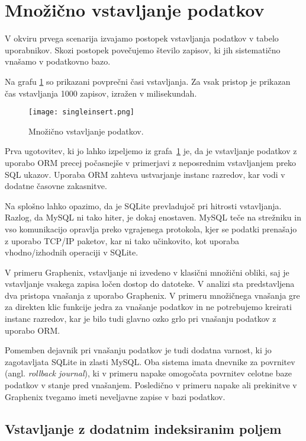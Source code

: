 \documentclass[a4paper,12pt,openright]{book}
\begin{document}
    \newpage
   \section{Množično vstavljanje podatkov}

    V okviru prvega scenarija izvajamo postopek vstavljanja podatkov v tabelo uporabnikov. Skozi postopek povečujemo število zapisov, ki jih sistematično vnašamo v podatkovno bazo.

    Na grafu \ref{vnos} so prikazani povprečni časi vstavljanja. Za vsak pristop je prikazan čas vstavljanja 1000 zapisov, izražen v milisekundah.
   
   \begin{figure}[H]
        \centerline{\texttt{[image: singleinsert.png]}}
        \caption{Množično vstavljanje podatkov.}
        \label{vnos}
    \end{figure}

    \noindent
    Prva ugotovitev, ki jo lahko izpeljemo iz grafa~\ref{vnos} je, da je vstavljanje podatkov z uporabo ORM precej počasnejše v primerjavi z neposrednim vstavljanjem preko SQL ukazov. Uporaba ORM zahteva ustvarjanje instanc razredov, kar vodi v dodatne časovne zakasnitve.

    Na splošno lahko opazimo, da je SQLite prevladujoč pri hitrosti vstavljanja. Razlog, da MySQL ni tako hiter, je dokaj enostaven. MySQL teče na strežniku in vso komunikacijo opravlja preko vgrajenega protokola, kjer se podatki prenašajo z uporabo TCP/IP paketov, kar ni tako učinkovito, kot uporaba vhodno/izhodnih operaciji v SQLite.

    V primeru Graphenix, vstavljanje ni izvedeno v klasični množični obliki, saj je vstavljanje vsakega zapisa ločen dostop do datoteke. V analizi sta predstavljena dva pristopa vnašanja z uporabo Graphenix. V primeru množičnega vnašanja gre za direkten klic funkcije jedra za vnašanje podatkov in ne potrebujemo kreirati instanc razredov, kar je bilo tudi glavno ozko grlo pri vnašanju podatkov z uporabo ORM.

    Pomemben dejavnik pri vnašanju podatkov je tudi dodatna varnost, ki jo zagotavljata SQLite in zlasti MySQL. Oba sistema imata dnevnike za povrnitev (angl. \textit{rollback journal}), ki v primeru napake omogočata povrnitev celotne baze podatkov v stanje pred vnašanjem. Posledično v primeru napake ali prekinitve v Graphenix tvegamo imeti neveljavne zapise v bazi podatkov.

    \subsection{Vstavljanje z dodatnim indeksiranim poljem}
\end{document}
